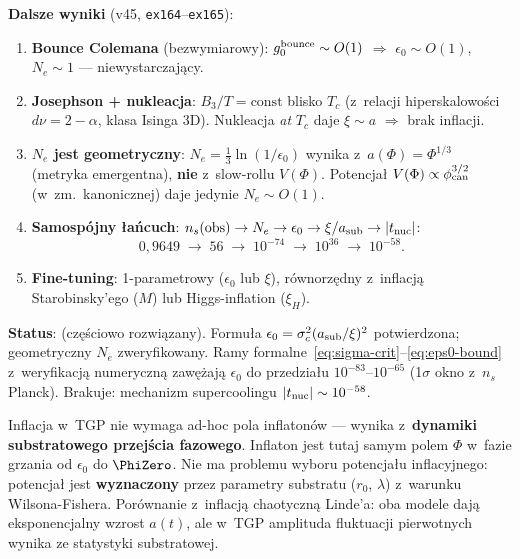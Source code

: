 \begin{remark}
\smallskip\noindent
\textbf{Dalsze wyniki} (v45, \texttt{ex164}--\texttt{ex165}):
\begin{enumerate}[nosep]
  \item \textbf{Bounce Colemana} (bezwymiarowy): $g_0^{\rm bounce} \sim O(1)$
    $\Rightarrow$ $\epsilon_0 \sim O(1)$, $N_e \sim 1$ --- niewystarczaj\k{a}cy.
  \item \textbf{Josephson + nukleacja}: $B_3/T = \text{const}$ blisko $T_c$
    (z~relacji hiperska\-lowości $d\nu = 2-\alpha$, klasa Isinga 3D).
    Nukleacja \emph{at} $T_c$ daje $\xi \sim a$ $\Rightarrow$ brak inflacji.
  \item \textbf{$N_e$ jest geometryczny}: $N_e = \tfrac{1}{3}\ln(1/\epsilon_0)$
    wynika z~$a(\Phi) = \Phi^{1/3}$ (metryka emergentna),
    \textbf{nie} z~slow-rollu $V(\Phi)$.
    Potencja\l{} $V(\Phi) \propto \phi_{\rm can}^{3/2}$ (w~zm.\ kanonicznej)
    daje jedynie $N_e \sim O(1)$.
  \item \textbf{Samospójny \l{}a\'ncuch}: $n_s(\text{obs}) \to N_e \to \epsilon_0
    \to \xi/a_{\rm sub} \to |t_{\rm nuc}|$:
    \[
      0{,}9649 \;\to\; 56 \;\to\; 10^{-74} \;\to\; 10^{36} \;\to\; 10^{-58}.
    \]
  \item \textbf{Fine-tuning}: 1-parametrowy ($\epsilon_0$ lub $\xi$),
    r\'ownorz\k{e}dny z~inflacj\k{a} Starobinsky'ego ($M$)
    lub Higgs-inflation ($\xi_H$).
\end{enumerate}

\smallskip\noindent
\textbf{Status}:  (cz\k{e}\'sciowo rozwi\k{a}zany).
Formu\l{}a $\epsilon_0 = \sigma^2_c (a_{\rm sub}/\xi)^2$ potwierdzona;
geometryczny $N_e$ zweryfikowany.
Ramy formalne~\eqref{eq:sigma-crit}--\eqref{eq:eps0-bound}
z~weryfikacj\k{a} numeryczn\k{a}
zawę\.zaj\k{a} $\epsilon_0$ do przedzia\l{}u $10^{-83}$--$10^{-65}$
(1$\sigma$ okno z~$n_s$ Planck).
Brakuje: mechanizm supercoolingu $|t_{\rm nuc}| \sim 10^{-58}$.
\end{remark}

\begin{remark}
Inflacja w~TGP nie wymaga ad-hoc pola inflaton\'ow ---
wynika z~\textbf{dynamiki substratowego przej\'scia fazowego}.
Inflaton jest tutaj samym polem $\Phi$ w~fazie grzania
od $\epsilon_0$ do $\PhiZero$. Nie ma problemu wyboru
potencja\l{}u inflacyjnego: potencja\l{} jest \textbf{wyznaczony}
przez parametry substratu ($r_0$, $\lambda$) z~warunku Wilsona-Fishera.
Por\'ownanie z~inflacj\k{a} chaotyczn\k{a} Linde'a: oba modele
daj\k{a} eksponencjalny wzrost $a(t)$, ale w~TGP amplituda
fluktuacji pierwotnych wynika ze statystyki substratowej.
\end{remark}

